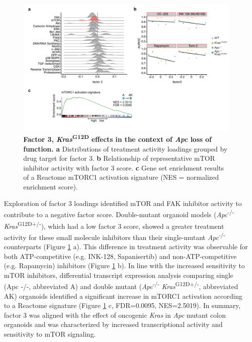 \begin{flushleft}
\begin{figure}[h]
\centering
\includegraphics[scale=0.75,
                keepaspectratio]{figures/adenomaprofiling/pdf/fig_4_1_1.pdf}
\caption[Factor 3, \textit{Kras}\textsuperscript{G12D} effects in the context of \textit{Apc} loss of function]{\textbf{Factor 3, \textit{Kras}\textsuperscript{G12D} effects in the context of \textit{Apc} loss of function. a} Distributions of treatment activity loadings grouped by drug target for factor 3. \textbf{b} Relationship of representative mTOR inhibitor activity with factor 3 score. \textbf{c} Gene set enrichment results of a Reactome mTORC1 activation signature (NES = normalized enrichment score).}
\label{fig_300}
\end{figure}
\bigbreak

Exploration of factor 3 loadings identified mTOR and FAK inhibitor activity to contribute to a negative factor score. Double-mutant organoid models (\textit{Apc}\textsuperscript{-/-} \textit{Kras}\textsuperscript{G12D+/-}), which had a low factor 3 score, showed a greater treatment activity for these small molecule inhibitors than their single-mutant \textit{Apc}\textsuperscript{-/-}  counterparts (Figure \ref{fig_300} a). This difference in treatment activity was observable for both ATP-competitive (e.g. INK-128, Sapanisertib) and non-ATP-competitive (e.g. Rapamycin) inhibitors (Figure \ref{fig_300} b). In line with the increased sensitivity to mTOR inhibitors, differential transcript expression analysis comparing single (Apc -/-, abbreviated A) and double mutant (\textit{Apc}\textsuperscript{-/-} \textit{Kras}\textsuperscript{G12D+/-}, abbreviated AK) organoids identified a significant increase in mTORC1 activation according to a Reactome signature (Figure \ref{fig_300} c, FDR=0.0095, NES=2.5019). In summary, factor 3 was aligned with the effect of oncogenic \textit{Kras} in \textit{Apc} mutant colon organoids and was characterized by increased transcriptional activity and sensitivity to mTOR signaling.



\end{flushleft}
